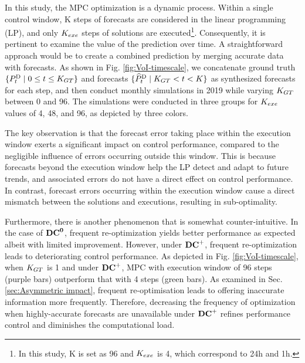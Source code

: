 In this study, the MPC optimization is a dynamic process. Within a single control window, K steps of forecasts are considered in the linear programming (LP), and only $K_{exe}$ steps of solutions are executed\footnote{In this study, K is set as 96 and $K_{exe}$ is 4, which correspond to 24h and 1h.}. Consequently, it is pertinent to examine the value of the prediction over time. A straightforward approach would be to create a combined prediction by merging accurate data with forecasts. As shown in Fig. \ref{fig:VoI-timescale}, we concatenate ground truth $\{P^\text{D}_{t} \mid 0\leq t \leq K_{GT}\}$ and forecasts $\{\widehat{P}^\text{D}_{t} \mid K_{GT}< t < K\}$ as synthesized forecasts for each step, and then conduct monthly simulations in 2019 while varying $K_{GT}$ between 0 and 96. The simulations were conducted in three groups for $K_{exe}$ values of 4, 48, and 96, as depicted by three colors.

The key observation is that the forecast error taking place within the execution window exerts a significant impact on control performance, compared to the negligible influence of errors occurring outside this window. This is because forecasts beyond the execution window help the LP detect and adapt to future trends, and associated errors do not have a direct effect on control performance. In contrast, forecast errors occurring within the execution window cause a direct mismatch between the solutions and executions, resulting in sub-optimality. 

Furthermore, there is another phenomenon that is somewhat counter-intuitive. In the case of $\mathbf{{DC}^{0}}$, frequent re-optimization yields better performance as expected albeit with limited improvement. However, under $\mathbf{{DC}^{+}}$, frequent re-optimization leads to deteriorating control performance. As depicted in Fig. \ref{fig:VoI-timescale}, when $K_{GT}$ is 1 and under $\mathbf{{DC}^{+}}$, MPC with execution window of 96 steps (purple bars) outperform that with 4 steps (green bars). As examined in Sec. \ref{sec:Asymmetric impact}, frequent re-optimisation leads to offering inaccurate information more frequently. Therefore, decreasing the frequency of optimization when highly-accurate forecasts are unavailable under $\mathbf{{DC}^{+}}$ refines performance control and diminishes the computational load.



